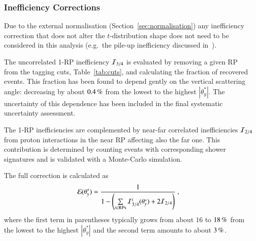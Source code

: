 
\subsubsection{Inefficiency Corrections}
\label{sec:ineff corr}

Due to the external normalisation (Section~\ref{sec:normalisation}) any inefficiency correction that does not alter the $t$-distribution shape does not need to be considered in this analysis (e.g.~the pile-up inefficiency discussed in~\cite{prl111}).

The uncorrelated 1-RP inefficiency ${\cal I}_{3/4}$ is evaluated by removing a given RP from the tagging cuts, Table~\ref{tab:cuts}, and calculating the fraction of recovered events. This fraction has been found to depend gently on the vertical scattering angle: decreasing by about $0.4\,{\rm \%}$ from the lowest to the highest $|\theta_y^*|$. The uncertainty of this dependence has been included in the final systematic uncertainty assessment.

The 1-RP inefficiencies are complemented by near-far correlated inefficiencies ${\cal I}_{2/4}$ from proton interactions in the near RP affecting also the far one. This contribution is determined by counting events with corresponding shower signatures and is validated with a Monte-Carlo simulation.

The full correction is calculated as
\begin{equation}
\label{efficiency}
	{\cal E}(\theta_y^*) = {1\over 1 - \left( \sum\limits_{i\in \rm RPs} {\cal I}^i_{3/4}(\theta_y^*) + 2 {\cal I}_{2/4} \right) } \ ,
\end{equation}
where the first term in parentheses typically grows from about $16$ to $18\,{\rm \%}$ from the lowest to the highest $|\theta_y^*|$ and the second term amounts to about $3\,{\rm \%}$.

